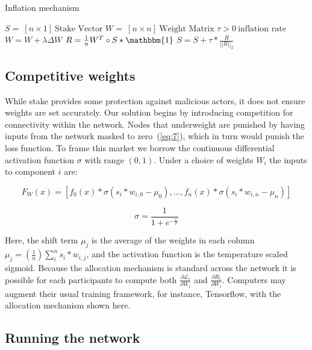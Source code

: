 \documentclass{article}
\begin{document}
\begin{algorithm}
	\caption{Inflation mechanism}
	\begin{algorithmic} 
		
		\REQUIRE $S = \ [n \times 1] \ \textrm{Stake Vector}$
		\REQUIRE $W = \ [n \times n] \ \textrm{Weight Matrix}$
		\REQUIRE $\tau > 0 \ \textrm{inflation rate}$
		\STATE $W = W + \lambda \Delta W$
		\STATE $R = \frac{1}{n} W^T \circ S * \mathbbm{1}$
		\STATE $S = S + \tau * \frac{R}{||R||_2}  $
		\ENDWHILE
	\end{algorithmic}
\end{algorithm}

\subsection{Competitive weights}
\label{sec:competitive_weights}
While stake provides some protection against malicious actors, it does not ensure weights are set accurately. Our solution begins by introducing competition for connectivity within the network. Nodes that underweight are punished by having inputs from the network masked to zero~(\ref{eq:7}), {\color{blue} which in turn would punish the loss function}. To frame this market we borrow the continuous differential activation function $\sigma$ with range $(0,1)$. Under a choice of weights $W_i$ the inputs to component $i$ are:

\begin{equation}
\label{eq:7}
F_W(x) =  [f_0(x) * \sigma(s_i * w_{i,0} - \mu_0),  ... , f_n(x) * \sigma(s_i * w_{i,n} - \mu_n)]
\end{equation}

\begin{equation}
\sigma =  \frac{1}{ 1 + e^{-\frac{x}{T}} }
\end{equation}

Here, the shift term $\mu_j$ is the average of the weights in each column $\mu_j = (\frac{1}{n}) \sum_{i}^{n}{s_i * w_{i,j}}$, and the activation function is the temperature scaled sigmoid. Because the allocation mechanism is standard across the network it is possible for each participants to compute both $\frac{\partial \mathcal{L}_i}{\partial W_i}$ and $\frac{\partial R_i}{\partial W_i}$. Computers may augment their usual training framework, for instance, Tensorflow, with the allocation mechanism shown here. 

\subsection{Running the network}
\end{document}
